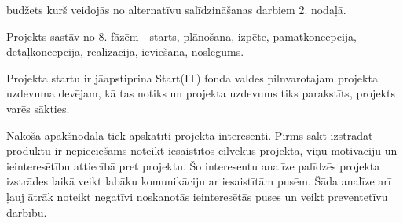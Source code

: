 budžets kurš veidojās no alternatīvu salīdzināšanas darbiem 2. nodaļā. 
\par
Projekts sastāv no 8. fāzēm - starts, plānošana, izpēte, pamatkoncepcija, detaļkoncepcija, 
realizācija, ieviešana, noslēgums. 
\par
Projekta startu ir jāapstiprina Start(IT) fonda valdes pilnvarotajam projekta uzdevuma devējam,
kā tas notiks un projekta uzdevums tiks parakstīts, projekts varēs sākties.
\par
Nākošā apakšnodaļā tiek apskatīti projekta interesenti. Pirms sākt izstrādāt produktu ir nepieciešams
noteikt iesaistītos cilvēkus projektā, viņu motivāciju un ieinteresētību attiecībā pret projektu.
Šo interesentu analīze palīdzēs projekta izstrādes laikā veikt labāku komunikāciju ar iesaistītām pusēm.
Šāda analīze arī ļauj ātrāk noteikt negatīvi noskaņotās ieinteresētās puses un veikt preventetīvu darbību.
